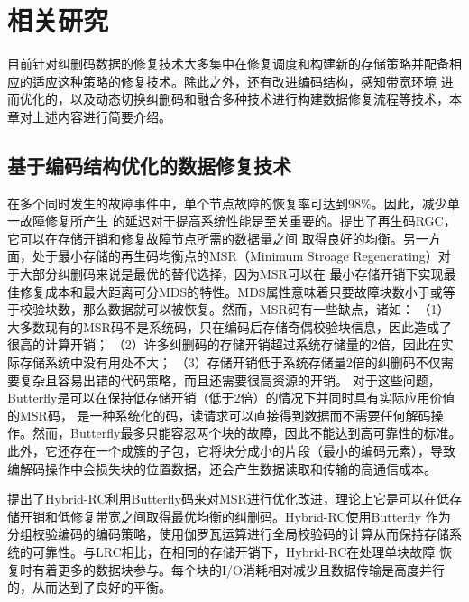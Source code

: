 \chapter{相关研究}


目前针对纠删码数据的修复技术大多集中在修复调度和构建新的存储策略并配备相应的适应这种策略的修复技术。除此之外，还有改进编码结构，感知带宽环境
进而优化的，以及动态切换纠删码和融合多种技术进行构建数据修复流程等技术，本章对上述内容进行简要介绍。


\section{基于编码结构优化的数据修复技术}

在多个同时发生的故障事件中，单个节点故障的恢复率可达到$98\%$\cite{rashmi2014hitchhiker,xia2015tale}。因此，减少单一故障修复所产生
的延迟对于提高系统性能是至关重要的。\citet{dimakis2007benefits,dimakis2010network}提出了再生码RGC，它可以在存储开销和修复故障节点所需的数据量之间
取得良好的均衡。另一方面，处于最小存储的再生码均衡点的MSR（Minimum Stroage Regenerating）对于大部分纠删码来说是最优的替代选择，因为MSR可以在
最小存储开销下实现最佳修复成本和最大距离可分MDS的特性。MDS属性意味着只要故障块数小于或等于校验块数，那么数据就可以被恢复。然而，MSR码有一些缺点，诸如：
（1）大多数现有的MSR码不是系统码，只在编码后存储奇偶校验块信息，因此造成了很高的计算开销；
（2）许多纠删码的存储开销超过系统存储量的2倍，因此在实际存储系统中没有用处不大；
（3）存储开销低于系统存储量2倍的纠删码不仅需要复杂且容易出错的代码策略，而且还需要很高资源的开销。
对于这些问题，Butterfly\cite{pamies2016opening}是可以在保持低存储开销（低于2倍）的情况下并同时具有实际应用价值的MSR码，
是一种系统化的码，读请求可以直接得到数据而不需要任何解码操作。然而，Butterfly最多只能容忍两个块的故障，因此不能达到高可靠性的标准。
此外，它还存在一个成簇的子包，它将块分成小的片段（最小的编码元素），导致编解码操作中会损失块的位置数据，还会产生数据读取和传输的高通信成本。

\citet{ye2017hybrid}提出了Hybrid-RC利用Butterfly码来对MSR进行优化改进，理论上它是可以在低存储开销和低修复带宽之间取得最优均衡的纠删码。Hybrid-RC使用Butterfly
作为分组校验编码的编码策略，使用伽罗瓦运算进行全局校验码的计算从而保持存储系统的可靠性。与LRC相比，在相同的存储开销下，Hybrid-RC在处理单块故障
恢复时有着更多的数据块参与。每个块的I/O消耗相对减少且数据传输是高度并行的，从而达到了良好的平衡。

